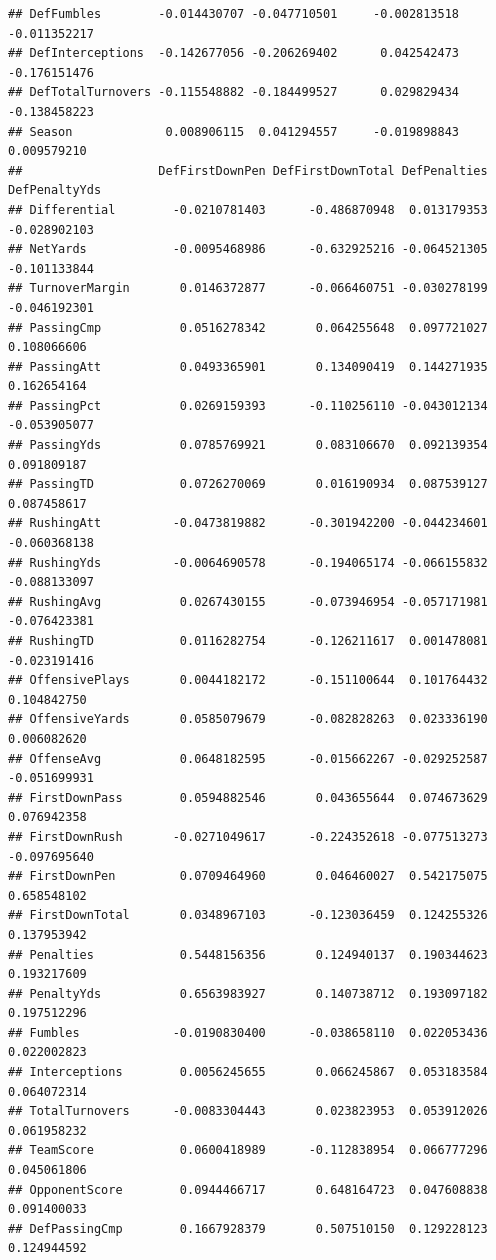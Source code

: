 \documentclass[
]{book}
\begin{document}
\begin{verbatim}
## DefFumbles        -0.014430707 -0.047710501     -0.002813518     -0.011352217
## DefInterceptions  -0.142677056 -0.206269402      0.042542473     -0.176151476
## DefTotalTurnovers -0.115548882 -0.184499527      0.029829434     -0.138458223
## Season             0.008906115  0.041294557     -0.019898843      0.009579210
##                   DefFirstDownPen DefFirstDownTotal DefPenalties DefPenaltyYds
## Differential        -0.0210781403      -0.486870948  0.013179353  -0.028902103
## NetYards            -0.0095468986      -0.632925216 -0.064521305  -0.101133844
## TurnoverMargin       0.0146372877      -0.066460751 -0.030278199  -0.046192301
## PassingCmp           0.0516278342       0.064255648  0.097721027   0.108066606
## PassingAtt           0.0493365901       0.134090419  0.144271935   0.162654164
## PassingPct           0.0269159393      -0.110256110 -0.043012134  -0.053905077
## PassingYds           0.0785769921       0.083106670  0.092139354   0.091809187
## PassingTD            0.0726270069       0.016190934  0.087539127   0.087458617
## RushingAtt          -0.0473819882      -0.301942200 -0.044234601  -0.060368138
## RushingYds          -0.0064690578      -0.194065174 -0.066155832  -0.088133097
## RushingAvg           0.0267430155      -0.073946954 -0.057171981  -0.076423381
## RushingTD            0.0116282754      -0.126211617  0.001478081  -0.023191416
## OffensivePlays       0.0044182172      -0.151100644  0.101764432   0.104842750
## OffensiveYards       0.0585079679      -0.082828263  0.023336190   0.006082620
## OffenseAvg           0.0648182595      -0.015662267 -0.029252587  -0.051699931
## FirstDownPass        0.0594882546       0.043655644  0.074673629   0.076942358
## FirstDownRush       -0.0271049617      -0.224352618 -0.077513273  -0.097695640
## FirstDownPen         0.0709464960       0.046460027  0.542175075   0.658548102
## FirstDownTotal       0.0348967103      -0.123036459  0.124255326   0.137953942
## Penalties            0.5448156356       0.124940137  0.190344623   0.193217609
## PenaltyYds           0.6563983927       0.140738712  0.193097182   0.197512296
## Fumbles             -0.0190830400      -0.038658110  0.022053436   0.022002823
## Interceptions        0.0056245655       0.066245867  0.053183584   0.064072314
## TotalTurnovers      -0.0083304443       0.023823953  0.053912026   0.061958232
## TeamScore            0.0600418989      -0.112838954  0.066777296   0.045061806
## OpponentScore        0.0944466717       0.648164723  0.047608838   0.091400033
## DefPassingCmp        0.1667928379       0.507510150  0.129228123   0.124944592

\end{verbatim}
\end{document}
